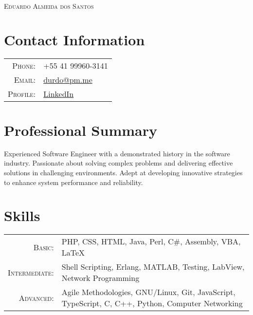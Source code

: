 \documentclass[a4paper,10pt]{article}
\begin{document}
\pagestyle{empty} %

\begin{center}
    {\Huge \textsc{Eduardo Almeida dos Santos}}\\
    \vspace{0.2cm}
\end{center}

\section*{Contact Information}
\begin{tabular}{@{} rl @{}}
    \textsc{Phone:}   & +55 41 99960-3141 \\
    \textsc{Email:}   & \href{mailto:durdo@pm.me}{durdo@pm.me} \\
    \textsc{Profile:} & \href{https://www.linkedin.com/in/durdo/}{LinkedIn} \\
\end{tabular}

\section*{Professional Summary}
    Experienced Software Engineer with a demonstrated history in the
    software industry. Passionate about solving complex problems and
    delivering effective solutions in challenging environments. Adept
    at developing innovative strategies to enhance system performance
    and reliability.

\section*{Skills}
\begin{tabular}{@{} r p{12cm} @{}}
    \textsc{Basic:} &
    PHP,
    CSS,
    HTML,
    Java,
    Perl,
    C\#,
    Assembly,
    VBA,
    \LaTeX \\

    \textsc{Intermediate:} &
    Shell Scripting,
    Erlang,
    MATLAB,
    Testing,
    LabView,
    Network Programming \\

    \textsc{Advanced:} &
    Agile Methodologies,
    GNU/Linux,
    Git,
    JavaScript,
    TypeScript,
    C,
    C++,
    Python,
    Computer Networking \\

\end{tabular}
\end{document}
